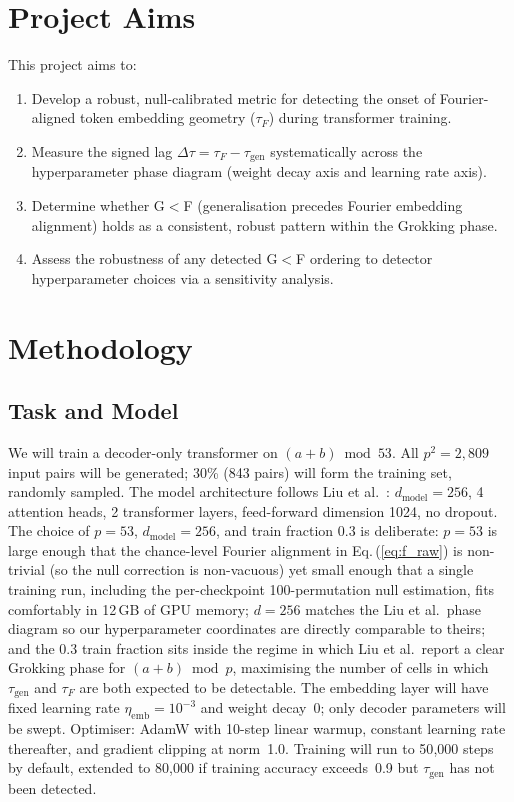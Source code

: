 \documentclass[12pt,openany,a4paper]{book}
\newcommand{\eq}[1]  {Eq.\,(\ref{#1})}
\newcommand{\taug}{\tau_{\mathrm{gen}}}
\newcommand{\tauf}{\tau_{F}}
\newcommand{\Dtau}{\Delta\tau}
\begin{document}
\section{Project Aims}

This project aims to:
\begin{enumerate}
  \item Develop a robust, null-calibrated metric for detecting the
    onset of Fourier-aligned token embedding geometry ($\tauf$) during
    transformer training.
  \item Measure the signed lag $\Dtau = \tauf - \taug$ systematically
    across the hyperparameter phase diagram (weight decay axis and
    learning rate axis).
  \item Determine whether G$<$F (generalisation precedes Fourier
    embedding alignment) holds as a consistent, robust pattern within
    the Grokking phase.
  \item Assess the robustness of any detected G$<$F ordering to
    detector hyperparameter choices via a sensitivity analysis.
\end{enumerate}

\section{Methodology}

\subsection{Task and Model}

We will train a decoder-only transformer \cite{vaswani2017attention}
on $(a+b)\bmod 53$.
All $p^2 = 2{,}809$ input pairs will be generated; 30\% (843 pairs)
will form the training set, randomly sampled.
The model architecture follows Liu et al.\ \cite{liu2022towards}:
$d_{\mathrm{model}}=256$, 4 attention heads, 2 transformer layers,
feed-forward dimension 1024, no dropout.
The choice of $p=53$, $d_{\mathrm{model}}=256$, and train fraction
$0.3$ is deliberate: $p=53$ is large enough that the chance-level
Fourier alignment in \eq{eq:f_raw} is non-trivial (so the null
correction is non-vacuous) yet small enough that a single training
run, including the per-checkpoint 100-permutation null estimation,
fits comfortably in 12\,GB of GPU memory; $d=256$ matches the
Liu et al.\ phase diagram so our hyperparameter coordinates are
directly comparable to theirs; and the $0.3$ train fraction sits
inside the regime in which Liu et al.\ report a clear Grokking phase
for $(a+b)\bmod p$, maximising the number of cells in which $\taug$
and $\tauf$ are both expected to be detectable.
The embedding layer will have fixed learning rate $\eta_{\mathrm{emb}}
= 10^{-3}$ and weight decay~0; only decoder parameters will be swept.
Optimiser: AdamW with 10-step linear warmup, constant learning rate
thereafter, and gradient clipping at norm~1.0.
Training will run to 50{,}000 steps by default, extended to 80{,}000
if training accuracy exceeds~0.9 but $\taug$ has not been detected.
\end{document}
